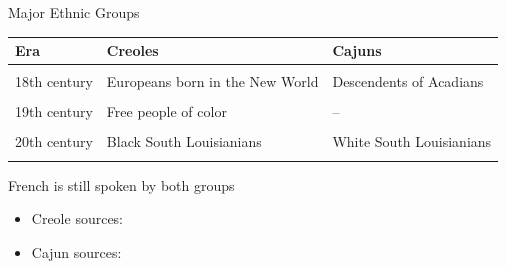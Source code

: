 \documentclass{beamer}\usepackage[]{graphicx}\usepackage[]{color}
\begin{document}
    \begin{frame}{Major Ethnic Groups}
      \begin{center}
        \begin{tabular}{l | l | l}
          Era          & Creoles                                          & Cajuns \\
          \hline
                       &                                                  & \\
          18th century & \parbox[t]{3cm}{Europeans born in the New World} & \parbox[t]{3cm}{Descendents of Acadians} \\
                       &                                                  & \\
          19th century & \parbox[t]{3cm}{Free people of color}            & -- \\
                       &                                                  & \\
          20th century & \parbox[t]{3cm}{Black South Louisianians}        & \parbox[t]{3cm}{White South Louisianians} \\
                       &                                                  & \\
          \hline
        \end{tabular}
      \end{center}
      \begin{center}
        French is still spoken by both groups
      \end{center}
      {\tiny
        \begin{itemize}
          \item Creole sources: \textcite{fortier_french_1884, susberry_racial_2004, neumann_creole_1985}
          \item Cajun sources: \textcite{brown_pronominal_1988, johnson_louisiana_1976, neumann_creole_1985, smith_influence_1939, giancarlo_dont_2019}
        \end{itemize}
      }
    \end{frame}
\end{document}
